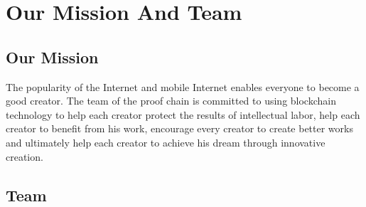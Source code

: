 \documentclass[a4paper,oneside,openany]{tufte-book}
\begin{document}


\chapter{Our Mission And Team}

\section{Our Mission}

\begin{quote}
\textsf{}
\end{quote}


The popularity of the Internet and mobile Internet enables everyone to become a good creator. The team of the proof chain is committed to using blockchain technology to help each creator protect the results of intellectual labor, help each creator to benefit from his work, encourage every creator to create better works and ultimately help each creator to achieve his dream through innovative creation.



\section{Team}
\end{document}

